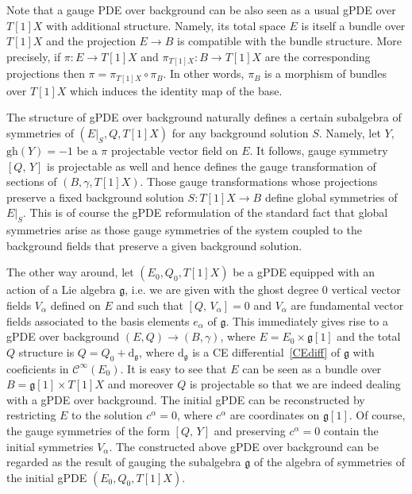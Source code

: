 \documentclass[a4paper,12pt]{article}
\numberwithin{equation}{section} %
\newcommand{\gh}[1]{\mathrm{gh}(#1)}
\newcommand{\commut}[2]{[#1{,}\,#2]}
\newcommand{\Liealg}{\mathfrak}
\newcommand{\algg}{\Liealg{g}}
\newcommand{\cC}{\mathcal{C}}
\newcommand{\dg}{\mathrm{d}_\algg}
\begin{document}
Note that a gauge PDE over background can be also seen as a usual gPDE over $T[1]X$ with additional structure.  Namely, its total space $E$ is itself a bundle over $T[1]X$ and the projection $E\to B$
is compatible with the bundle structure. More precisely, if $\pi:E\to T[1]X$ and
$\pi_{T[1]X}:B\to T[1]X$ are the corresponding projections then $\pi = \pi_{T[1]X}\circ \pi_B$. In other words, $\pi_B$ is a morphism of bundles over $T[1]X$ which induces the identity map of the base.

The structure of gPDE over background naturally defines a certain subalgebra of symmetries of $(E|_{S},Q,T[1]X)$ for any background solution $S$. Namely, let $Y$, $\gh{Y}=-1$ be a $\pi$ projectable vector field on $E$. It follows, gauge symmetry $\commut{Q}{Y}$ is projectable as well and hence defines the gauge transformation of sections of $(B,\gamma,T[1]X)$. Those gauge transformations whose projections  preserve a fixed background solution $S:T[1]X\to B$ define global symmetries of $E|_{S}$.  This is of course the gPDE reformulation of the standard fact that global symmetries arise as those gauge symmetries of the system coupled to the background fields that preserve a given background solution.

The other way around, let $(E_0,Q_0,T[1]X)$ be a gPDE equipped with an action of a Lie algebra $\algg$, i.e. we are given with the ghost degree $0$ vertical vector fields $V_\alpha$ defined on $E$  and such that $\commut{Q}{V_\alpha}=0$ and $V_\alpha$ are fundamental vector fields associated to the basis elements $e_\alpha$ of $\algg$. This immediately gives rise to a gPDE  over background $(E,Q) \rightarrow (B,\gamma)$, where $E = E_0\times \algg[1]$ and the total $Q$ structure is $Q=Q_0+\dg$, where $\dg$ is a CE differential~\eqref{CEdiff} of $\algg$ with coeficients in $\cC^\infty(E_0)$. It is easy to see that $E$ can be seen as a bundle over $B=\algg[1]\times T[1]X$ and moreover $Q$ is projectable so that we are indeed dealing with a gPDE over background. The initial gPDE can be reconstructed by restricting  $E$ to the solution $c^\alpha=0$, where $c^\alpha$ are coordinates on $\algg[1]$. Of course, the gauge symmetries of the form $\commut{Q}{Y}$ and preserving $c^\alpha=0$ contain the initial symmetries $V_\alpha$. The constructed above gPDE over background can be regarded as the result of gauging the subalgebra $\algg$ of the algebra of symmetries of the initial gPDE $(E_0,Q_0,T[1]X)$.
\end{document}
